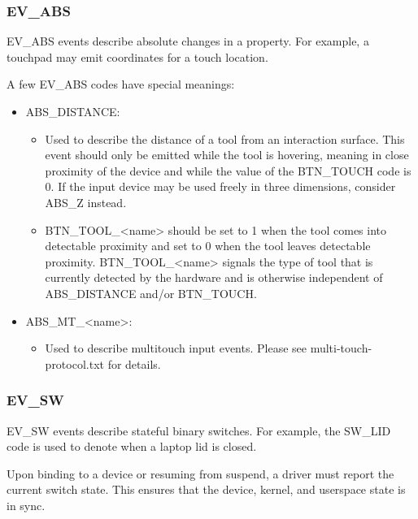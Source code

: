 \documentclass[a4paper,8pt,english]{sphinxmanual}
\begin{document}
\subsubsection{EV\_ABS}
\label{input/event-codes:ev-abs}
EV\_ABS events describe absolute changes in a property. For example, a touchpad
may emit coordinates for a touch location.

A few EV\_ABS codes have special meanings:
\begin{itemize}
\item {} 
ABS\_DISTANCE:
\begin{itemize}
\item {} 
Used to describe the distance of a tool from an interaction surface. This
event should only be emitted while the tool is hovering, meaning in close
proximity of the device and while the value of the BTN\_TOUCH code is 0. If
the input device may be used freely in three dimensions, consider ABS\_Z
instead.

\item {} 
BTN\_TOOL\_\textless{}name\textgreater{} should be set to 1 when the tool comes into detectable
proximity and set to 0 when the tool leaves detectable proximity.
BTN\_TOOL\_\textless{}name\textgreater{} signals the type of tool that is currently detected by the
hardware and is otherwise independent of ABS\_DISTANCE and/or BTN\_TOUCH.

\end{itemize}

\item {} 
ABS\_MT\_\textless{}name\textgreater{}:
\begin{itemize}
\item {} 
Used to describe multitouch input events. Please see
multi-touch-protocol.txt for details.

\end{itemize}

\end{itemize}


\subsubsection{EV\_SW}
\label{input/event-codes:ev-sw}
EV\_SW events describe stateful binary switches. For example, the SW\_LID code is
used to denote when a laptop lid is closed.

Upon binding to a device or resuming from suspend, a driver must report
the current switch state. This ensures that the device, kernel, and userspace
state is in sync.
\end{document}
